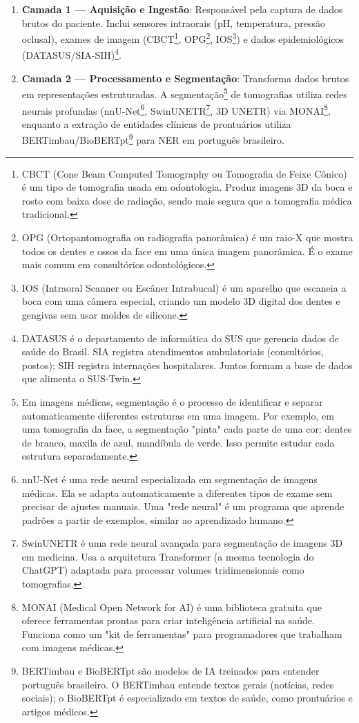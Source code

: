\begin{enumerate}
    \item \textbf{Camada 1 --- Aquisição e Ingestão}: Responsável pela captura de dados brutos do paciente. Inclui sensores intraorais (pH, temperatura, pressão oclusal), exames de imagem (CBCT\footnote{CBCT (Cone Beam Computed Tomography ou Tomografia de Feixe Cônico) é um tipo de tomografia usada em odontologia. Produz imagens 3D da boca e rosto com baixa dose de radiação, sendo mais segura que a tomografia médica tradicional.}, OPG\footnote{OPG (Ortopantomografia ou radiografia panorâmica) é um raio-X que mostra todos os dentes e ossos da face em uma única imagem panorâmica. É o exame mais comum em consultórios odontológicos.}, IOS\footnote{IOS (Intraoral Scanner ou Escâner Intrabucal) é um aparelho que escaneia a boca com uma câmera especial, criando um modelo 3D digital dos dentes e gengivas sem usar moldes de silicone.}) e dados epidemiológicos (DATASUS/SIA-SIH)\footnote{DATASUS é o departamento de informática do SUS que gerencia dados de saúde do Brasil. SIA registra atendimentos ambulatoriais (consultórios, postos); SIH registra internações hospitalares. Juntos formam a base de dados que alimenta o SUS-Twin.}. 
    
    \item \textbf{Camada 2 --- Processamento e Segmentação}: Transforma dados brutos em representações estruturadas. A segmentação\footnote{Em imagens médicas, segmentação é o processo de identificar e separar automaticamente diferentes estruturas em uma imagem. Por exemplo, em uma tomografia da face, a segmentação "pinta" cada parte de uma cor: dentes de branco, maxila de azul, mandíbula de verde. Isso permite estudar cada estrutura separadamente.} de tomografias utiliza redes neurais profundas (nnU-Net\footnote{nnU-Net é uma rede neural especializada em segmentação de imagens médicas. Ela se adapta automaticamente a diferentes tipos de exame sem precisar de ajustes manuais. Uma "rede neural" é um programa que aprende padrões a partir de exemplos, similar ao aprendizado humano.}, SwinUNETR\footnote{SwinUNETR é uma rede neural avançada para segmentação de imagens 3D em medicina. Usa a arquitetura Transformer (a mesma tecnologia do ChatGPT) adaptada para processar volumes tridimensionais como tomografias.}, 3D UNETR) via MONAI\footnote{MONAI (Medical Open Network for AI) é uma biblioteca gratuita que oferece ferramentas prontas para criar inteligência artificial na saúde. Funciona como um "kit de ferramentas" para programadores que trabalham com imagens médicas.}, enquanto a extração de entidades clínicas de prontuários utiliza BERTimbau/BioBERTpt\footnote{BERTimbau e BioBERTpt são modelos de IA treinados para entender português brasileiro. O BERTimbau entende textos gerais (notícias, redes sociais); o BioBERTpt é especializado em textos de saúde, como prontuários e artigos médicos.} para NER em português brasileiro.
    

\end{enumerate}
